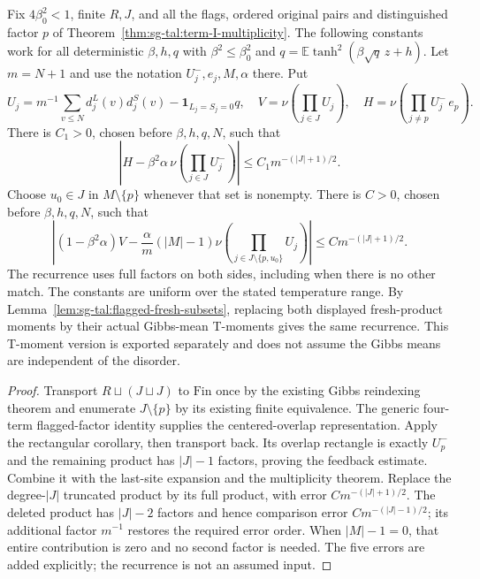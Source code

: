 \begin{theorem}
\label{thm:sg-tal:pair-factor-recurrence}
\leanok
{}
Fix $4\beta_0^2<1$, finite $R,J$, and all the flags, ordered original pairs and
distinguished factor $p$ of Theorem~\ref{thm:sg-tal:term-I-multiplicity}.
The following constants work for all deterministic $\beta,h,q$ with
$\beta^2\le\beta_0^2$ and $q=\mathbb E\tanh^2(\beta\sqrt q\,z+h)$.
Let $m=N+1$ and use the notation $U_j^-,e_j,M,\alpha$ there. Put
\[
 U_j=m^{-1}\sum_{v\le N}d_j^L(v)d_j^S(v)-\mathbf1_{L_j=S_j=0}q,
 \quad V=\nu\left(\prod_{j\in J}U_j\right),\quad
 H=\nu\left(\prod_{j\ne p}U_j^-\,e_p\right).
\]
There is $C_1>0$, chosen before $\beta,h,q,N$, such that
\[
 |H-\beta^2\alpha\,\nu(\prod_{j\in J}U_j^-)|
 \le C_1m^{-(|J|+1)/2}.
\]
Choose $u_0\in J$ in $M\setminus\{p\}$ whenever that set is nonempty.
There is $C>0$, chosen before $\beta,h,q,N$, such that
\[
 \left|(1-\beta^2\alpha)V-
   \frac{\alpha}{m}(|M|-1)\nu\left(\prod_{j\in J\setminus\{p,u_0\}}U_j\right)\right|
 \le C m^{-(|J|+1)/2}.
\]
The recurrence uses full factors on both sides, including when there is no other match.
The constants are uniform over the stated temperature range. By
Lemma~\ref{lem:sg-tal:flagged-fresh-subsets}, replacing both displayed fresh-product
moments by their actual Gibbs-mean T-moments gives the same recurrence. This
T-moment version is exported separately and does not assume the Gibbs means are
independent of the disorder.
\end{theorem}
\begin{proof}
\leanok
Transport $R\sqcup(J\sqcup J)$ to $\mathrm{Fin}$ once by the existing Gibbs reindexing
theorem and enumerate $J\setminus\{p\}$ by its existing finite equivalence. The generic
four-term flagged-factor identity supplies the centered-overlap representation.
Apply the rectangular corollary, then transport back. Its overlap rectangle is exactly
$U_p^-$ and the remaining product has $|J|-1$ factors, proving the feedback estimate.
Combine it with the last-site expansion and the multiplicity theorem. Replace the
degree-$|J|$ truncated product by its full product, with error $Cm^{-(|J|+1)/2}$.
The deleted product has $|J|-2$ factors and hence comparison error
$Cm^{-(|J|-1)/2}$; its additional factor $m^{-1}$ restores the required error order.
When $|M|-1=0$, that entire contribution is zero and no second factor is needed.
The five errors are added explicitly; the recurrence is not an assumed input.
\end{proof}

